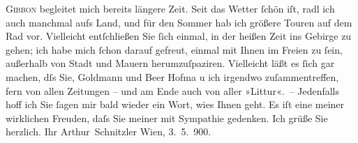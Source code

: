 \begin{ledgroupsized}[t]{13cm}
                  \textsc{Gibbon} begleitet mich bereits längere Zeit.\pend
           \pstart
           Seit das Wetter ſchön iſt, radl ich auch manchmal aufs Land, und für den Sommer hab
               ich {\pb}größere Touren auf dem Rad vor. Vielleicht
               entſchließen Sie ſich einmal, in der heißen Zeit ins Gebirge zu gehen; ich habe mich
               ſchon darauf  gefreut,
               einmal mit Ihnen im Freien zu ſein, außerhalb von Stadt und Mauern herumzuſpaziren.
               Vielleicht läßt es ſich gar machen, dſs Sie, Goldmann und Beer Hofma{\geminationn} u ich irgendwo zuſammentreffen, fern von allen Zeitungen – und am Ende auch von
               aller »Lit\damage{\textcolor{gray}{era}}tur«. –\pend
           \pstart
           Jedenfalls hoff ich Sie ſagen mir bald wieder ein Wort, wies Ihnen {\pb}geht. Es iſt eine meiner wirklichen Freuden, daſs
               Sie meiner mit Sympathie gedenken. Ich grüße Sie herzlich.\pend
           \pstart Ihr \spacefill\mbox{Arthur Schnitzler}\pend{}\pstart
           Wien, 3. 5. 900.\pend
           
         
         \endnumbering{}\end{ledgroupsized}  \newcommand{\dateiname}{L01034}\newcommand{\titel}{Arthur Schnitzler an Georg Brandes, 3. 5. 1900}\newcommand{\editorInnen}{Martin Anton Müller und Gerd-Hermann Susen}
      